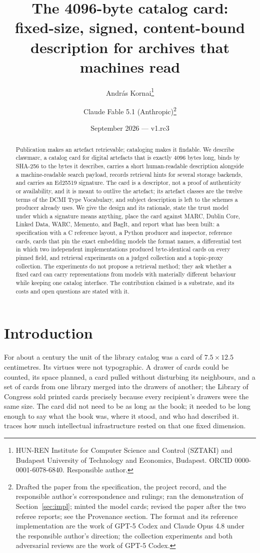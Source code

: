\documentclass[11pt]{article}
\title{The 4096-byte catalog card:\\ fixed-size, signed, content-bound description for archives that machines read}
\author{Andr\'as Kornai\thanks{HUN-REN Institute for Computer Science and Control (SZTAKI) and Budapest University of Technology and Economics, Budapest. ORCID 0000-0001-6078-6840. Responsible author.}
  \and Claude Fable 5.1 (Anthropic)\thanks{Drafted the paper from the specification, the project record, and the responsible author's correspondence and rulings; ran the demonstration of Section~\ref{sec:impl}; minted the model cards; revised the paper after the two referee reports; see the Provenance section. The format and its reference implementation are the work of GPT-5 Codex and Claude Opus 4.8 under the responsible author's direction; the collection experiments and both adversarial reviews are the work of GPT-5 Codex.}}
\date{September 2026 --- v1.rc3}
\begin{document}
\maketitle

\begin{abstract}
Publication makes an artefact retrievable; cataloging makes it findable. We
describe clawmarc, a catalog card for digital artefacts that is exactly 4096
bytes long, binds by SHA-256 to the bytes it describes, carries a short
human-readable description alongside a machine-readable search payload,
records retrieval hints for several storage backends, and carries an Ed25519
signature. The card is a descriptor, not a proof of authenticity or
availability, and it is meant to outlive the artefact; its artefact classes
are the twelve terms of the DCMI Type Vocabulary, and subject description is
left to the schemes a producer already uses. We give the design and its
rationale, state the trust model under which a signature means anything,
place the card against MARC, Dublin Core, Linked Data, WARC, Memento, and
BagIt, and report what has been built: a specification with a C reference
layout, a Python producer and inspector, reference cards, cards that pin the
exact embedding models the format names, a differential test in which two
independent implementations produced byte-identical cards on every pinned
field, and retrieval experiments on a judged collection and a topic-proxy
collection. The experiments do not propose a retrieval method; they ask
whether a fixed card can carry representations from models with materially
different behaviour while keeping one catalog interface. The contribution
claimed is a substrate, and its costs and open questions are stated with it.
\end{abstract}

\section{Introduction}

For about a century the unit of the library catalog was a card of
$7.5 \times 12.5$ centimetres. Its virtues were not typographic. A drawer of
cards could be counted, its space planned, a card pulled without disturbing its
neighbours, and a set of cards from one library merged into the drawers of
another; the Library of Congress sold printed cards precisely because every
recipient's drawers were the same size. The card did not need to be as long as
the book; it needed to be long enough to say what the book was, where it stood,
and who had described it. \citet{Krajewski:2011} traces how much intellectual
infrastructure rested on that one fixed dimension.
\end{document}
